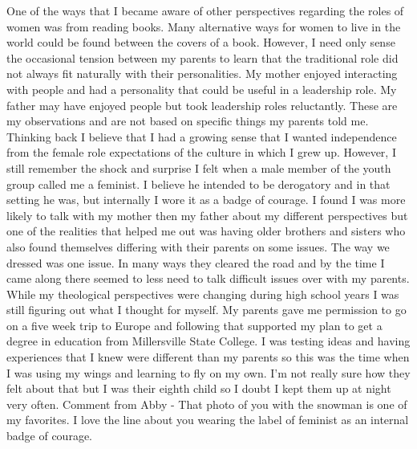One of the ways that I became aware of other perspectives regarding the roles of women was from reading books. Many alternative ways for women to live in the world could be found between the covers of a book. However, I need only sense the occasional tension between my parents to learn that the traditional role did not always fit naturally with their personalities. My mother enjoyed interacting with people and had a personality that could be useful in a leadership role. My father may have enjoyed people but took leadership roles reluctantly. These are my observations and are not based on specific things my parents told me. 
Thinking back I believe that I had a growing sense that I wanted independence from the female role expectations of the culture in which I grew up. However, I still remember the shock and surprise I felt when a male member of the youth group called me a feminist. I believe he intended to be derogatory and in that setting he was, but internally I wore it as a badge of courage. 
I found I was more likely to talk with my mother then my father about my different perspectives but one of the realities that helped me out was having older brothers and sisters who also found themselves differing with their parents on some issues. The way we dressed was one issue. In many ways they cleared the road and by the time I came along there seemed to less need to talk difficult issues over with my parents. 
While my theological perspectives were changing during high school years I was still figuring out what I thought for myself. My parents gave me permission to go on a five week trip to Europe and following that supported my plan to get a degree in education from Millersville State College. I was testing ideas and having experiences that I knew were different than my parents so this was the time when I was using my wings and learning to fly on my own. I'm not really sure how they felt about that but I was their eighth child so I doubt I kept them up at night very often.
Comment from Abby - That photo of you with the snowman is one of my favorites. I love the line about you wearing the label of feminist as an internal badge of courage.





